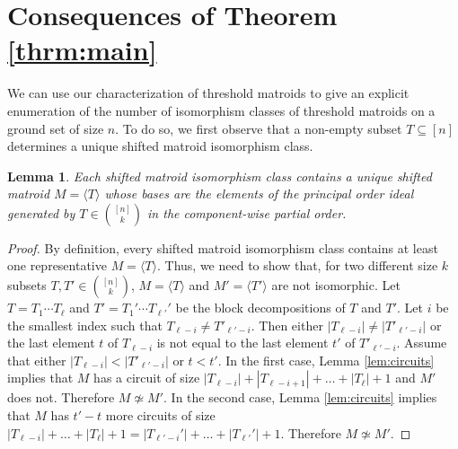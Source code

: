 \documentclass{amsart}
\theoremstyle{definition}
\theoremstyle{plain}
\newtheorem{lemma}[defn]{Lemma}
\begin{document}
\section{Consequences of Theorem \ref{thrm:main}}
\label{sec:consequences}

We can use our characterization of threshold matroids to give an explicit enumeration of the number of isomorphism classes of threshold matroids on a ground set of size $n$. To do so, we first observe that a non-empty subset $T\subseteq [n]$ determines a unique shifted matroid isomorphism class.

\begin{lemma}
  \label{lem:iso}
Each shifted matroid isomorphism class contains a unique shifted matroid $M=\langle T \rangle$ whose bases are the elements of the principal order ideal generated by $T\in \binom{[n]}{k}$ in the component-wise partial order.
\end{lemma}
\begin{proof}
  By definition, every shifted matroid isomorphism class contains at least one representative $M=\langle T \rangle$. Thus, we need to show that, for two different size $k$ subsets $T,T'\in \binom{[n]}{k}$, $M=\langle T\rangle $ and $M'=\langle T'\rangle$ are not isomorphic. Let $T=T_1\cdots T_\ell$ and $T'=T_1'\cdots T_{\ell'}'$ be the block decompositions of $T$ and $T'$. Let $i$ be the smallest index such that $T_{\ell-i}\neq T'_{\ell'-i}$. Then either $|T_{\ell-i}|\neq |T'_{\ell'-i}|$ or the last element $t$ of $T_{\ell-i}$ is not equal to the last element $t'$ of $T'_{\ell'-i}$. Assume that either $|T_{\ell-i}|< |T'_{\ell'-i}|$ or $t<t'$. In the first case, Lemma \ref{lem:circuits} implies that $M$ has a circuit of size $|T_{\ell-i}|+|T_{\ell-i+1}|+\ldots+ |T_{\ell}|+1$ and $M'$ does not. Therefore $M\not\simeq M'$. In the second case, Lemma \ref{lem:circuits} implies that $M$ has $t'-t$ more circuits of size $|T_{\ell-i}|+\ldots + |T_\ell|+1 = |T_{\ell'-i}'|+\ldots + |T_{\ell'}'|+1$. Therefore $M\not\simeq M'$.
\end{proof}
\end{document}
